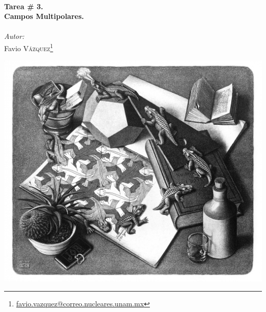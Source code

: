 \documentclass[a4paper,11pt]{article}
\numberwithin{equation}{section}
\begin{document}
\begin{titlepage}

\HRule \\[0.4cm]
{ \huge \bfseries Tarea \# 3. \\ Campos Multipolares.}\\[0.2cm] %
\HRule \\[0.1cm]
 
\setcounter{footnote}{0}
\center
\large
\emph{Autor:} \\ %
\Large Favio \textsc{Vázquez}\footnote[1]{\href{mailto:favio.vazquez@correo.nucleares.unam.mx}{favio.vazquez@correo.nucleares.unam.mx}}


\includegraphics[scale=0.132]{reptilesEscher}


\vfill %

\end{titlepage}
\end{document}
